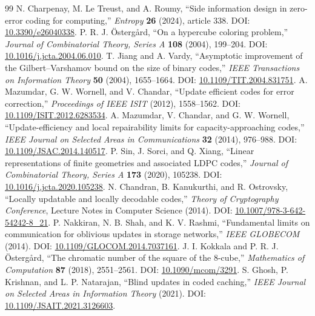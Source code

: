 \documentclass[11pt,a4paper]{article}
\begin{document}
\begin{thebibliography}{99}
 N. Charpenay, M. Le Treust, and A. Roumy, ``Side information design in zero-error coding for computing,'' \emph{Entropy} \textbf{26} (2024), article 338. DOI: \href{https://doi.org/10.3390/e26040338}{10.3390/e26040338}.
 P. R. J. {\"O}sterg{\aa}rd, ``On a hypercube coloring problem,'' \emph{Journal of Combinatorial Theory, Series A} \textbf{108} (2004), 199--204. DOI: \href{https://doi.org/10.1016/j.jcta.2004.06.010}{10.1016/j.jcta.2004.06.010}.
 T. Jiang and A. Vardy, ``Asymptotic improvement of the Gilbert--Varshamov bound on the size of binary codes,'' \emph{IEEE Transactions on Information Theory} \textbf{50} (2004), 1655--1664. DOI: \href{https://doi.org/10.1109/TIT.2004.831751}{10.1109/TIT.2004.831751}.
 A. Mazumdar, G. W. Wornell, and V. Chandar, ``Update efficient codes for error correction,'' \emph{Proceedings of IEEE ISIT} (2012), 1558--1562. DOI: \href{https://doi.org/10.1109/ISIT.2012.6283534}{10.1109/ISIT.2012.6283534}.
 A. Mazumdar, V. Chandar, and G. W. Wornell, ``Update-efficiency and local repairability limits for capacity-approaching codes,'' \emph{IEEE Journal on Selected Areas in Communications} \textbf{32} (2014), 976--988. DOI: \href{https://doi.org/10.1109/JSAC.2014.140517}{10.1109/JSAC.2014.140517}.
 P. Sin, J. Sorci, and Q. Xiang, ``Linear representations of finite geometries and associated LDPC codes,'' \emph{Journal of Combinatorial Theory, Series A} \textbf{173} (2020), 105238. DOI: \href{https://doi.org/10.1016/j.jcta.2020.105238}{10.1016/j.jcta.2020.105238}.
 N. Chandran, B. Kanukurthi, and R. Ostrovsky, ``Locally updatable and locally decodable codes,'' \emph{Theory of Cryptography Conference}, Lecture Notes in Computer Science (2014). DOI: \href{https://doi.org/10.1007/978-3-642-54242-8\_21}{10.1007/978-3-642-54242-8\_21}.
 P. Nakkiran, N. B. Shah, and K. V. Rashmi, ``Fundamental limits on communication for oblivious updates in storage networks,'' \emph{IEEE GLOBECOM} (2014). DOI: \href{https://doi.org/10.1109/GLOCOM.2014.7037161}{10.1109/GLOCOM.2014.7037161}.
 J. I. Kokkala and P. R. J. {\"O}sterg{\aa}rd, ``The chromatic number of the square of the 8-cube,'' \emph{Mathematics of Computation} \textbf{87} (2018), 2551--2561. DOI: \href{https://doi.org/10.1090/mcom/3291}{10.1090/mcom/3291}.
 S. Ghosh, P. Krishnan, and L. P. Natarajan, ``Blind updates in coded caching,'' \emph{IEEE Journal on Selected Areas in Information Theory} (2021). DOI: \href{https://doi.org/10.1109/JSAIT.2021.3126603}{10.1109/JSAIT.2021.3126603}.

\end{thebibliography}
\end{document}
